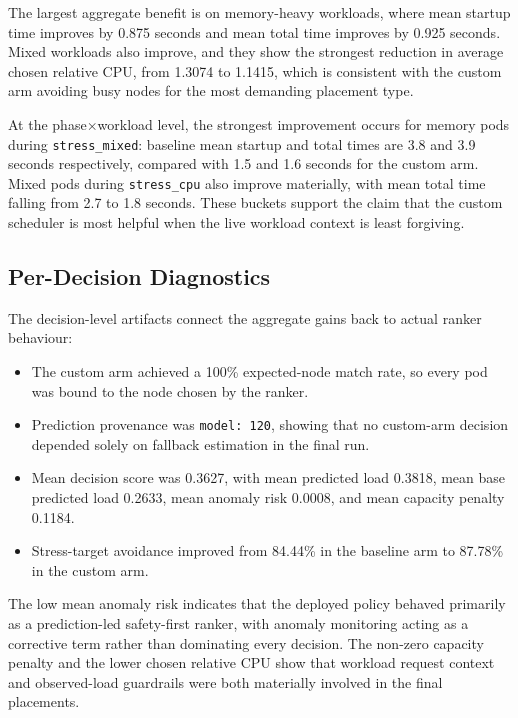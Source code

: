 The largest aggregate benefit is on memory-heavy workloads, where mean startup time improves by 0.875 seconds and mean total time improves by 0.925 seconds. Mixed workloads also improve, and they show the strongest reduction in average chosen relative CPU, from 1.3074 to 1.1415, which is consistent with the custom arm avoiding busy nodes for the most demanding placement type.

At the phase\(\times\)workload level, the strongest improvement occurs for memory pods during \texttt{stress\_mixed}: baseline mean startup and total times are 3.8 and 3.9 seconds respectively, compared with 1.5 and 1.6 seconds for the custom arm. Mixed pods during \texttt{stress\_cpu} also improve materially, with mean total time falling from 2.7 to 1.8 seconds. These buckets support the claim that the custom scheduler is most helpful when the live workload context is least forgiving.


\subsection{Per-Decision Diagnostics}

The decision-level artifacts connect the aggregate gains back to actual ranker behaviour:

\begin{itemize}
\item The custom arm achieved a 100\% expected-node match rate, so every pod was bound to the node chosen by the ranker.
\item Prediction provenance was \texttt{model: 120}, showing that no custom-arm decision depended solely on fallback estimation in the final run.
\item Mean decision score was 0.3627, with mean predicted load 0.3818, mean base predicted load 0.2633, mean anomaly risk 0.0008, and mean capacity penalty 0.1184.
\item Stress-target avoidance improved from 84.44\% in the baseline arm to 87.78\% in the custom arm.
\end{itemize}

The low mean anomaly risk indicates that the deployed policy behaved primarily as a prediction-led safety-first ranker, with anomaly monitoring acting as a corrective term rather than dominating every decision. The non-zero capacity penalty and the lower chosen relative CPU show that workload request context and observed-load guardrails were both materially involved in the final placements.


